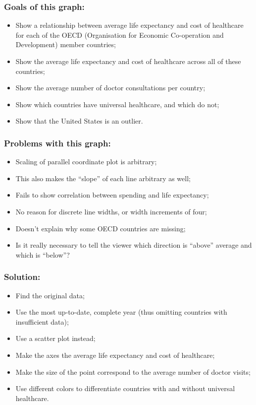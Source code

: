 \documentclass{beamer}
\begin{document}
\begin{frame}
    \frametitle{Goals of this graph:}
    \begin{itemize}
        \item Show a relationship between average life expectancy and cost of healthcare for each of the OECD (Organisation for Economic Co-operation and Development) member countries;
        \item Show the average life expectancy and cost of healthcare across all of these countries;
        \item Show the average number of doctor consultations per country;
        \item Show which countries have universal healthcare, and which do not;
        \item Show that the United States is an outlier.
    \end{itemize}
\end{frame}

\begin{frame}
    \frametitle{Problems with this graph:}
    \begin{itemize}
        \item Scaling of parallel coordinate plot is arbitrary;
        \item This also makes the ``slope'' of each line arbitrary as well;
        \item Fails to show correlation between spending and life expectancy;
        \item No reason for discrete line widths, or width increments of four;
        \item Doesn't explain why some OECD countries are missing;
        \item Is it really necessary to tell the viewer which direction is ``above'' average and which is ``below''?
    \end{itemize}
\end{frame}

\begin{frame}
    \frametitle{Solution:}
    \begin{itemize}
        \item Find the original data;
        \item Use the most up-to-date, complete year (thus omitting countries with insufficient data);
        \item Use a scatter plot instead;
        \item Make the axes the average life expectancy and cost of healthcare;
        \item Make the size of the point correspond to the average number of doctor visits;
        \item Use different colors to differentiate countries with and without universal healthcare.
    \end{itemize}
\end{frame}
\end{document}
